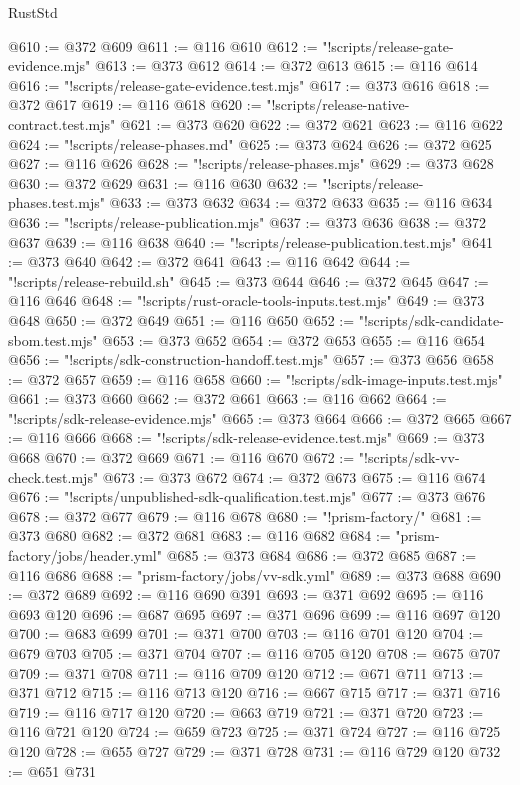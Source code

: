 \begin{lexlean}{RustStd}
\begin{coremodule}
@610 := @372 @609
@611 := @116 @610
@612 := "!scripts/release-gate-evidence.mjs"
@613 := @373 @612
@614 := @372 @613
@615 := @116 @614
@616 := "!scripts/release-gate-evidence.test.mjs"
@617 := @373 @616
@618 := @372 @617
@619 := @116 @618
@620 := "!scripts/release-native-contract.test.mjs"
@621 := @373 @620
@622 := @372 @621
@623 := @116 @622
@624 := "!scripts/release-phases.md"
@625 := @373 @624
@626 := @372 @625
@627 := @116 @626
@628 := "!scripts/release-phases.mjs"
@629 := @373 @628
@630 := @372 @629
@631 := @116 @630
@632 := "!scripts/release-phases.test.mjs"
@633 := @373 @632
@634 := @372 @633
@635 := @116 @634
@636 := "!scripts/release-publication.mjs"
@637 := @373 @636
@638 := @372 @637
@639 := @116 @638
@640 := "!scripts/release-publication.test.mjs"
@641 := @373 @640
@642 := @372 @641
@643 := @116 @642
@644 := "!scripts/release-rebuild.sh"
@645 := @373 @644
@646 := @372 @645
@647 := @116 @646
@648 := "!scripts/rust-oracle-tools-inputs.test.mjs"
@649 := @373 @648
@650 := @372 @649
@651 := @116 @650
@652 := "!scripts/sdk-candidate-sbom.test.mjs"
@653 := @373 @652
@654 := @372 @653
@655 := @116 @654
@656 := "!scripts/sdk-construction-handoff.test.mjs"
@657 := @373 @656
@658 := @372 @657
@659 := @116 @658
@660 := "!scripts/sdk-image-inputs.test.mjs"
@661 := @373 @660
@662 := @372 @661
@663 := @116 @662
@664 := "!scripts/sdk-release-evidence.mjs"
@665 := @373 @664
@666 := @372 @665
@667 := @116 @666
@668 := "!scripts/sdk-release-evidence.test.mjs"
@669 := @373 @668
@670 := @372 @669
@671 := @116 @670
@672 := "!scripts/sdk-vv-check.test.mjs"
@673 := @373 @672
@674 := @372 @673
@675 := @116 @674
@676 := "!scripts/unpublished-sdk-qualification.test.mjs"
@677 := @373 @676
@678 := @372 @677
@679 := @116 @678
@680 := "!prism-factory/"
@681 := @373 @680
@682 := @372 @681
@683 := @116 @682
@684 := "prism-factory/jobs/header.yml"
@685 := @373 @684
@686 := @372 @685
@687 := @116 @686
@688 := "prism-factory/jobs/vv-sdk.yml"
@689 := @373 @688
@690 := @372 @689
@692 := @116 @690 @391
@693 := @371 @692
@695 := @116 @693 @120
@696 := @687 @695
@697 := @371 @696
@699 := @116 @697 @120
@700 := @683 @699
@701 := @371 @700
@703 := @116 @701 @120
@704 := @679 @703
@705 := @371 @704
@707 := @116 @705 @120
@708 := @675 @707
@709 := @371 @708
@711 := @116 @709 @120
@712 := @671 @711
@713 := @371 @712
@715 := @116 @713 @120
@716 := @667 @715
@717 := @371 @716
@719 := @116 @717 @120
@720 := @663 @719
@721 := @371 @720
@723 := @116 @721 @120
@724 := @659 @723
@725 := @371 @724
@727 := @116 @725 @120
@728 := @655 @727
@729 := @371 @728
@731 := @116 @729 @120
@732 := @651 @731

\end{coremodule}
\end{lexlean}
